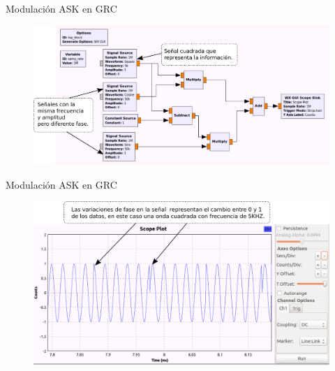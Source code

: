 \begin{frame}{Modulación ASK en GRC}
\begin{figure}[H]
\centering
\includegraphics[width=\textwidth]{parte1/lab4/pdf/lab4_8.pdf}
\end{figure}
\end{frame}
\begin{frame}{Modulación ASK en GRC}
\begin{figure}[H]
\centering
\includegraphics[width=\textwidth]{parte1/lab4/pdf/lab4_9.pdf}
\end{figure}
\end{frame}
